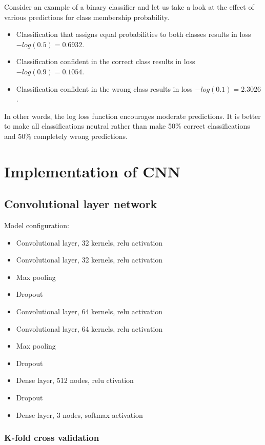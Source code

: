 \documentclass[a4paper, 11pt, table]{article}
\begin{document}
Consider an example of a binary classifier and let us take a look at the effect of various predictions for class membership probability. 
\begin{itemize}
\item Classification that assigns equal probabilities to both classes results in loss $-log(0.5)=0.6932$.  

\item Classification confident in the correct class results in loss $-log(0.9)=0.1054$.

\item Classification confident in the wrong class results in loss $-log(0.1)=2.3026$. 
\end{itemize}

In other words, the log loss function encourages moderate predictions. It is better to make all classifications neutral rather than make 50\% correct classifications and 50\% completely wrong predictions.

\section{Implementation of CNN}

\subsection{Convolutional layer network}

Model configuration:
\begin{itemize}
\item Convolutional layer, 32 kernels, relu activation
\item Convolutional layer, 32 kernels, relu activation
\item Max pooling
\item Dropout
\item Convolutional layer, 64 kernels, relu activation
\item Convolutional layer, 64 kernels, relu activation
\item Max pooling
\item Dropout
\item Dense layer, 512 nodes, relu ctivation
\item Dropout
\item Dense layer, 3 nodes, softmax activation

\end{itemize}

\subsubsection{K-fold cross validation}
\end{document}
